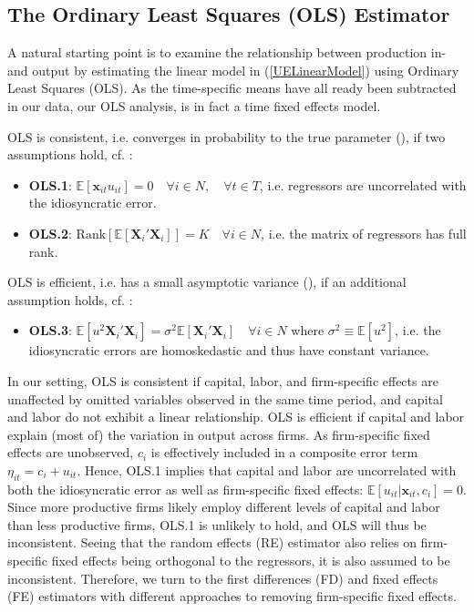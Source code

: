 \documentclass[11pt]{article}
\begin{document}
\subsection{The Ordinary Least Squares (OLS) Estimator}
A natural starting point is to examine the relationship between production in- and output by estimating the linear model in (\ref{UELinearModel}) using Ordinary Least Squares (OLS). As the time-specific means have all ready been subtracted in our data, our OLS analysis, is in fact a time fixed effects model.

OLS is consistent, i.e. converges in probability to the true parameter (\cite{AP}), if two assumptions hold, cf. \cite{Wooldrige_2010_4}: 
\begin{itemize}
    \item[] \textbf{OLS.1}: $\mathbb{E}[\textbf{x}_{it}u_{it}]=0 \quad \forall i\in N, \quad \forall t \in T$, i.e. regressors are uncorrelated with the idiosyncratic error. 
    \item[] \textbf{OLS.2}: $\text{Rank}\left[\mathbb{E}[\textbf{X}_i'\textbf{X}_i]\right]=K\quad \forall i\in N$, i.e. the matrix of regressors has full rank. 
\end{itemize}
OLS is efficient, i.e. has a small asymptotic variance (\cite{Wooldridge_2016_5}), if an additional assumption holds, cf. \cite{Wooldrige_2010_4}:
\begin{itemize}
    \item[] \textbf{OLS.3}:  $\mathbb{E}[u^2\textbf{X}_i'\textbf{X}_i]=\sigma^2\mathbb{E}[\textbf{X}_i'\textbf{X}_i] \quad \forall i\in N$ where $\sigma^2\equiv \mathbb{E}[u^2]$, i.e. the idiosyncratic errors are homoskedastic and thus have constant variance. 
\end{itemize}
In our setting, OLS is consistent if capital, labor, and firm-specific effects are unaffected by omitted variables observed in the same time period, and capital and labor do not exhibit a linear relationship. OLS is efficient if capital and labor explain (most of) the variation in output across firms. 
As firm-specific fixed effects are unobserved, $c_i$ is effectively included in a composite error term $\eta_{it}=c_i+u_{it}$. Hence, OLS.1 implies that capital and labor are uncorrelated with both the idiosyncratic error as well as firm-specific fixed effects: $\mathbb{E}\left[u_{it}|\textbf{x}_{it},c_i\right]=0$. Since more productive firms likely employ different levels of capital and labor than less productive firms, OLS.1 is unlikely to hold, and OLS will thus be inconsistent. Seeing that the random effects (RE) estimator also relies on firm-specific fixed effects being orthogonal to the regressors, it is also assumed to be inconsistent. Therefore, we turn to the first differences (FD) and fixed effects (FE) estimators with different approaches to removing firm-specific fixed effects. 
\end{document}
